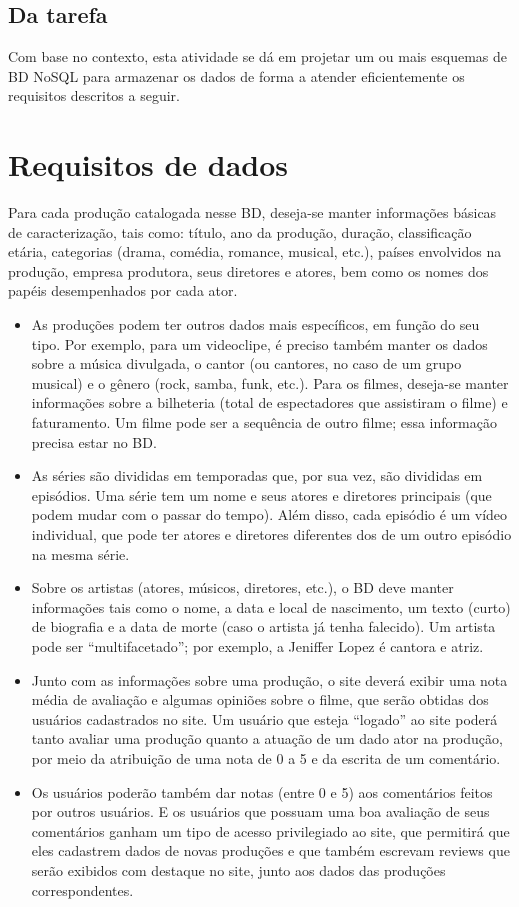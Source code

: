 \documentclass[
	12pt,				%
	openright,			%
	oneside,			%
	a4paper,			%
	english,			%
	french,				%
	spanish,			%
	brazil,				%
	]{abntex2}
\begin{document}
\section{Da tarefa}
Com base no contexto, esta atividade se dá em projetar um ou mais esquemas de BD NoSQL para armazenar os dados de forma a atender eficientemente os requisitos descritos a seguir. 

\chapter{Requisitos de dados}
Para cada produção catalogada nesse BD, deseja-se manter informações básicas de caracterização, tais como: título, ano da produção, duração, classificação etária, categorias (drama, comédia, romance, musical, etc.), países envolvidos na produção, empresa produtora, seus diretores e atores, bem como os nomes dos papéis desempenhados por cada ator.

\begin{itemize}
  \item As produções podem ter outros dados mais específicos, em função do seu tipo. Por exemplo, para um videoclipe, é preciso também manter os dados sobre a música divulgada, o cantor (ou cantores, no caso de um grupo musical) e o gênero (rock, samba, funk, etc.). Para os filmes, deseja-se manter informações sobre a bilheteria (total de espectadores que assistiram o filme) e faturamento. Um filme pode ser a sequência de outro filme; essa informação precisa estar no BD.
  \item As séries são divididas em temporadas que, por sua vez, são divididas em episódios. Uma série tem um nome e seus atores e diretores principais (que podem mudar com o passar do tempo). Além disso, cada episódio é um vídeo individual, que pode ter atores e diretores diferentes dos de um outro episódio na mesma série.
  \item Sobre os artistas (atores, músicos, diretores, etc.), o BD deve manter informações tais como o nome, a data e local de nascimento, um texto (curto) de biografia e a data de morte (caso o artista já tenha falecido). Um artista pode ser “multifacetado”; por exemplo, a Jeniffer Lopez é cantora e atriz.
  \item Junto com as informações sobre uma produção, o site deverá exibir uma nota média de avaliação e algumas opiniões sobre o filme, que serão obtidas dos usuários cadastrados no site. Um usuário que esteja “logado” ao site poderá tanto avaliar uma produção quanto a atuação de um dado ator na produção, por meio da atribuição de uma nota de 0 a 5 e da escrita de um comentário.
  \item Os usuários poderão também dar notas (entre 0 e 5) aos comentários feitos por outros usuários. E os usuários que possuam uma boa avaliação de seus comentários ganham um tipo de acesso privilegiado ao site, que permitirá que eles cadastrem dados de novas produções e que também escrevam reviews que serão exibidos com destaque no site, junto aos dados das produções correspondentes.
\end{itemize}
\end{document}
